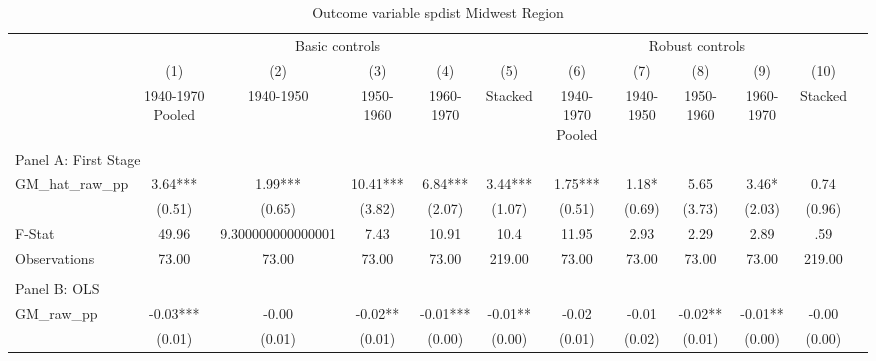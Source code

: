  \begin{table}[htbp]\centering {} \begin{threeparttable} \caption{Outcome variable spdist Midwest Region} \begin{tabular}{l*{11}{c}} \toprule
          &\multicolumn{5}{c}{Basic controls}                                   &\multicolumn{5}{c}{Robust controls}                                  \\\cmidrule(lr){2-6}\cmidrule(lr){7-11}
          &\multicolumn{1}{c}{(1)}&\multicolumn{1}{c}{(2)}&\multicolumn{1}{c}{(3)}&\multicolumn{1}{c}{(4)}&\multicolumn{1}{c}{(5)}&\multicolumn{1}{c}{(6)}&\multicolumn{1}{c}{(7)}&\multicolumn{1}{c}{(8)}&\multicolumn{1}{c}{(9)}&\multicolumn{1}{c}{(10)}\\
          &\multicolumn{1}{c}{1940-1970 Pooled}&\multicolumn{1}{c}{1940-1950}&\multicolumn{1}{c}{1950-1960}&\multicolumn{1}{c}{1960-1970}&\multicolumn{1}{c}{Stacked}&\multicolumn{1}{c}{1940-1970 Pooled}&\multicolumn{1}{c}{1940-1950}&\multicolumn{1}{c}{1950-1960}&\multicolumn{1}{c}{1960-1970}&\multicolumn{1}{c}{Stacked}\\
\cmidrule(lr){1-11}
\multicolumn{10}{l}{Panel A: First Stage}\\
\cmidrule(lr){1-11}
GM\_hat\_raw\_pp&      3.64***&      1.99***&     10.41***&      6.84***&      3.44***&      1.75***&      1.18*  &      5.65   &      3.46*  &      0.74   \\
          &    (0.51)   &    (0.65)   &    (3.82)   &    (2.07)   &    (1.07)   &    (0.51)   &    (0.69)   &    (3.73)   &    (2.03)   &    (0.96)   \\
\midrule
F-Stat    &     49.96   &9.300000000000001   &      7.43   &     10.91   &      10.4   &     11.95   &      2.93   &      2.29   &      2.89   &       .59   \\
Observations&     73.00   &     73.00   &     73.00   &     73.00   &    219.00   &     73.00   &     73.00   &     73.00   &     73.00   &    219.00   \\
\cmidrule[\heavyrulewidth](lr){1-11} \\ \cmidrule[\heavyrulewidth](lr){1-11}
\multicolumn{10}{l}{Panel B: OLS}\\
\cmidrule(lr){1-11}
GM\_raw\_pp &     -0.03***&     -0.00   &     -0.02** &     -0.01***&     -0.01** &     -0.02   &     -0.01   &     -0.02** &     -0.01** &     -0.00   \\
          &    (0.01)   &    (0.01)   &    (0.01)   &    (0.00)   &    (0.00)   &    (0.01)   &    (0.02)   &    (0.01)   &    (0.00)   &    (0.00)   \\

\end{tabular}
\end{threeparttable}
\end{table}
